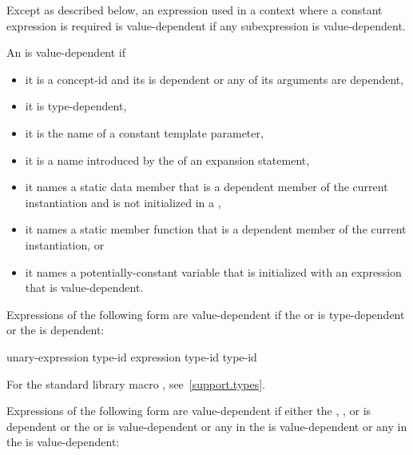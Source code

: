 \pnum
Except as described below, an expression used in a context where a
constant expression is required is value-dependent if any
subexpression is value-dependent.

\pnum
An
is value-dependent if
\begin{itemize}
\item
it is a concept-id and
its  is dependent or
any of its arguments are dependent,
\item
it is type-dependent,
\item
it is the name of a constant template parameter,
\item
it is a name introduced by the 
of an expansion statement,
\item
it names a static data member that is a dependent member of the current
instantiation and is not initialized in a ,
\item
it names a static member function that is a dependent member of the current
instantiation, or
\item
it names a potentially-constant variable
that is initialized with an expression that is value-dependent.
\end{itemize}

Expressions of the following form are value-dependent if the
 or 
is type-dependent or the
is dependent:

\begin{ncsimplebnf}
 unary-expression\br
{} \terminal{(} type-id \terminal{)}\br
{} \terminal{(} expression \terminal{)}\br
{} \terminal{(} type-id \terminal{)}\br
{} \terminal{(} type-id \terminal{)}
\end{ncsimplebnf}

\begin{note}
For the standard library macro ,
see~\ref{support.types}.
\end{note}

\pnum
Expressions of the following form are value-dependent if either the
,
, or
is dependent or the
or
is value-dependent or
any  in the 
is value-dependent or
any  in the 
is value-dependent:

